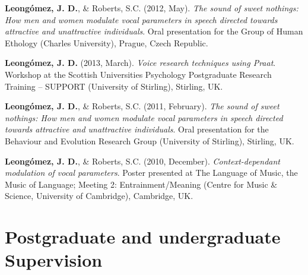 \documentclass[11pt,a4paper,]{awesome-cv}
\begin{document}
\textbf{Leongómez, J. D.}, \& Roberts, S.C. (2012, May). \emph{The sound
of sweet nothings: How men and women modulate vocal parameters in speech
directed towards attractive and unattractive individuals}. Oral
presentation for the Group of Human Ethology (Charles University),
Prague, Czech Republic.

\textbf{Leongómez, J. D.} (2013, March). \emph{Voice research techniques
using Praat}. Workshop at the Scottish Universities Psychology
Postgraduate Research Training -- SUPPORT (University of Stirling),
Stirling, UK.

\textbf{Leongómez, J. D.}, \& Roberts, S.C. (2011, February). \emph{The
sound of sweet nothings: How men and women modulate vocal parameters in
speech directed towards attractive and unattractive individuals}. Oral
presentation for the Behaviour and Evolution Research Group (University
of Stirling), Stirling, UK.

\textbf{Leongómez, J. D.}, \& Roberts, S.C. (2010, December).
\emph{Context-dependant modulation of vocal parameters}. Poster
presented at The Language of Music, the Music of Language; Meeting 2:
Entrainment/Meaning (Centre for Music \& Science, University of
Cambridge), Cambridge, UK.

\endgroup

\hypertarget{postgraduate-and-undergraduate-supervision}{%
\section{Postgraduate and undergraduate
Supervision}\label{postgraduate-and-undergraduate-supervision}}
\end{document}
